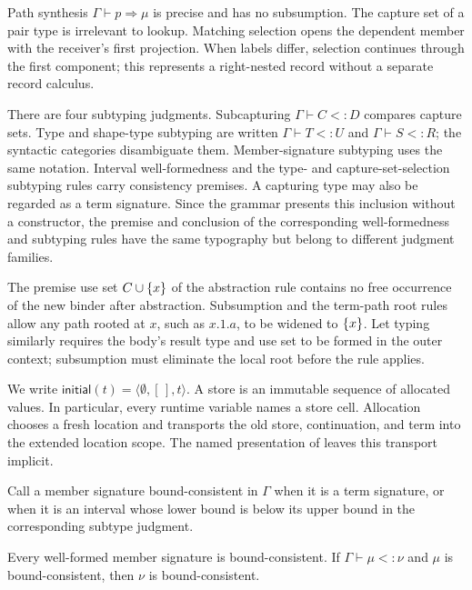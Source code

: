 \documentclass[acmsmall,screen,nonacm]{acmart}
\begin{document}
\endgroup
\clearpage

Path synthesis \(\Gamma\vdash p\Rightarrow\mu\) is precise and has no
subsumption. The capture set of a pair type is irrelevant to lookup. Matching
selection opens the dependent member with the receiver's first projection.
When labels differ, selection continues through the first component; this
represents a right-nested record without a separate record calculus.

There are four subtyping judgments. Subcapturing
\(\Gamma\vdash C<:D\) compares capture sets. Type and shape-type
subtyping are written \(\Gamma\vdash T<:U\) and
\(\Gamma\vdash S<:R\); the syntactic categories disambiguate them.
Member-signature subtyping uses the same notation. Interval
well-formedness and the type- and capture-set-selection subtyping rules carry
consistency premises. A capturing type may also be regarded as a
term signature. Since the grammar presents this inclusion without a
constructor, the premise and conclusion of the corresponding
well-formedness and subtyping rules have the same typography but belong to
different judgment families.

The premise use set \(C\cup\{{x}\}\) of the abstraction rule contains no free
occurrence of the new binder after abstraction. Subsumption and the term-path
root rules allow any path
rooted at \(x\), such as \(x.1.a\), to be widened to \(\{{x}\}\). Let
typing similarly requires the body's result type and use set to be
formed in the outer context; subsumption must eliminate the local root before
the rule applies.

We write
\(\mathsf{initial}(t)=\langle\emptyset,[\,],t\rangle\). A store is an
immutable sequence of allocated values. In particular, every runtime variable names
a store cell.  Allocation chooses a fresh location and transports the old
store, continuation, and term into the extended location scope.  The named
presentation of  leaves this transport implicit.

Call a member signature bound-consistent in \(\Gamma\) when it is a
term signature, or when it is an interval whose lower bound is below its
upper bound in the corresponding subtype judgment.

\begin{lemma}
\label{lem:bound-consistency}
Every well-formed member signature is bound-consistent. If
\(\Gamma\vdash\mu<:\nu\) and \(\mu\) is bound-consistent, then \(\nu\) is
bound-consistent.
\end{lemma}
\end{document}
